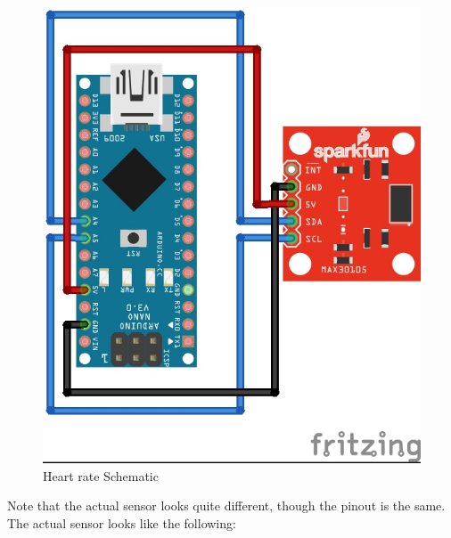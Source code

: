 \documentclass{report}
\begin{document}
\begin{figure}[H]
\begin{center}
\includegraphics[scale=1.25]{images/heartrate_bb.jpg}
\caption{Heart rate Schematic}
\end{center}
\end{figure}

Note that the actual sensor looks quite different, though the pinout is the same.\\

The actual sensor looks like the following:\\
\end{document}
